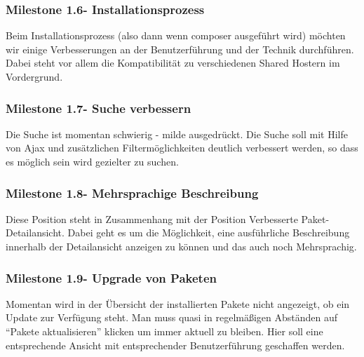 \documentclass[
paper=a4,
draft=false,%
fontsize=10pt%
]{scrartcl}
\begin{document}
\subsubsection{Milestone 1.6\footnotemark - Installationsprozess}


Beim Installationsprozess (also dann wenn composer ausgeführt wird) möchten wir einige Verbesserungen an der Benutzerführung und der Technik durchführen. Dabei steht vor allem die Kompatibilität zu verschiedenen Shared Hostern im Vordergrund.

\subsubsection{Milestone 1.7\footnotemark - Suche verbessern}


Die Suche ist momentan schwierig - milde ausgedrückt. Die Suche soll mit Hilfe von Ajax und zusätzlichen Filtermöglichkeiten deutlich verbessert werden, so dass es möglich sein wird gezielter zu suchen.

\subsubsection{Milestone 1.8\footnotemark - Mehrsprachige Beschreibung}


Diese Position steht in Zusammenhang mit der Position Verbesserte Paket-Detailansicht. Dabei geht es um die Möglichkeit, eine ausführliche Beschreibung innerhalb der Detailansicht anzeigen zu können und das auch noch Mehrsprachig.

\subsubsection{Milestone 1.9\footnotemark - Upgrade von Paketen}


Momentan wird in der Übersicht der installierten Pakete nicht angezeigt, ob ein Update zur Verfügung steht. Man muss quasi in regelmäßigen Abständen auf “Pakete aktualisieren” klicken um immer aktuell zu bleiben. Hier soll eine entsprechende Ansicht mit entsprechender Benutzerführung geschaffen werden.
\end{document}
